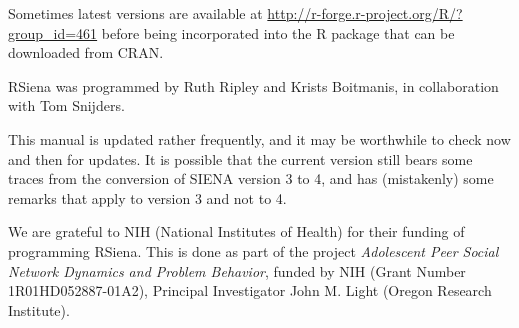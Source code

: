 \documentclass[a4paper,fleqn]{article}
\newcommand{\+}{\, + \,}
\newcommand{\rs}{{\sf RSiena}}
\newcommand{\RS}{{\sf RSiena }}
\newcommand{\SI}{{\sf SIENA }}
\begin{document}
Sometimes latest versions are available at
\url{http://r-forge.r-project.org/R/?group_id=461}
before being incorporated into the R package that can be downloaded from CRAN.

\RS was programmed by
Ruth Ripley and Krists Boitmanis, in collaboration with Tom Snijders.

This manual is updated rather frequently, and it may be worthwhile
to check now and then for updates.
It is possible that the current version still bears some traces
from the conversion of \SI version 3 to 4, and has (mistakenly)
some remarks that apply to version 3 and not to 4.

We are grateful to NIH (National Institutes of Health)
for their funding of programming \rs.
This is done
as part of the project \emph{Adolescent Peer Social Network Dynamics
and Problem Behavior}, funded by NIH (Grant Number 1R01HD052887-01A2),
Principal Investigator John M. Light (Oregon Research Institute).
\end{document}
